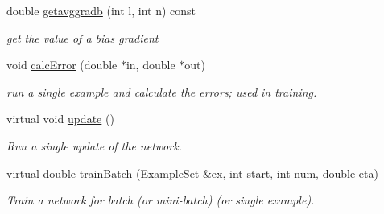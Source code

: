 \begin{DoxyCompactItemize}
double \hyperlink{classBPNet_a916264dd0b58dcfae3d473231f7d0892}{getavggradb} (int l, int n) const 
\begin{DoxyCompactList}\small\item\em get the value of a bias gradient \end{DoxyCompactList}\item 
void \hyperlink{classBPNet_a98e5db7247f0358375c27d1bb091f6ab}{calc\+Error} (double $\ast$in, double $\ast$out)
\begin{DoxyCompactList}\small\item\em run a single example and calculate the errors; used in training. \end{DoxyCompactList}\item 
virtual void \hyperlink{classBPNet_af60f5bfa6cb7dffd75a9a127b811a208}{update} ()
\begin{DoxyCompactList}\small\item\em Run a single update of the network. \end{DoxyCompactList}\item 
virtual double \hyperlink{classBPNet_a3f820464f3338ed7305e9de950cd2103}{train\+Batch} (\hyperlink{classExampleSet}{Example\+Set} \&ex, int start, int num, double eta)
\begin{DoxyCompactList}\small\item\em Train a network for batch (or mini-\/batch) (or single example). \end{DoxyCompactList}\end{DoxyCompactItemize}
